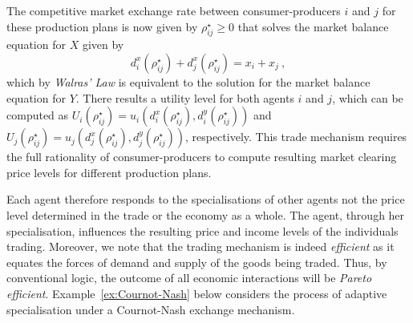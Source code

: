 The competitive market exchange rate between consumer-producers $i$ and $j$ for these production plans is now given by $\rho^{\star}_{ij} \geqslant 0$ that solves the market balance equation for $X$ given by
\begin{equation}
d^{x}_{i}(\rho^{\star}_{ij}) + d^{x}_{j}(\rho^{\star}_{ij}) = x_{i} + x_{j} ~ ,
\end{equation}
which by \emph{Walras' Law} is equivalent to the solution for the market balance equation for $Y$. There results a utility level for both agents $i$ and $j$, which can be computed as $U_{i}(\rho^{\star}_{ij}) = u_{i} \left( d^{x}_{i}(\rho^{\star}_{ij}), d^{y}_{i}(\rho^{\star}_{ij}) \right)$ and $U_{j}(\rho^{\star}_{ij}) = u_{j} \left( d^{x}_{j}(\rho^{\star}_{ij}), d^{y}_{j}(\rho^{\star}_{ij}) \right)$, respectively. This trade mechanism requires the full rationality of consumer-producers to compute resulting market clearing price levels for different production plans.

Each agent therefore responds to the specialisations of other agents not the price level determined in the trade or the economy as a whole. The agent, through her specialisation, influences the resulting price and income levels of the individuals trading. Moreover, we note that the trading mechanism is indeed \emph{efficient} as it equates the forces of demand and supply of the goods being traded. Thus, by conventional logic, the outcome of all economic interactions will be \emph{Pareto efficient}. Example~\ref{ex:Cournot-Nash} below considers the process of adaptive specialisation under a Cournot-Nash exchange mechanism.

